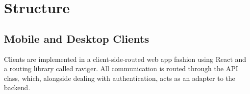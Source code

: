 \section{Structure}
\subsection{Mobile and Desktop Clients}

Clients are implemented in a client-side-routed web app fashion using React and a routing library called raviger. All communication is routed through the API class, which, alongside dealing with authentication, acts as an adapter to the backend.

